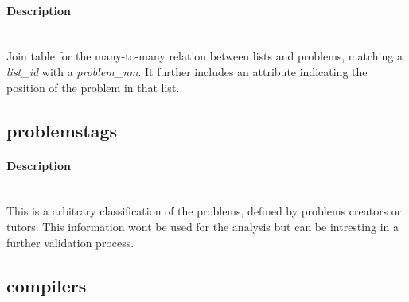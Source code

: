 \paragraph{Description}~\\ %
Join table for the many-to-many relation between lists and problems, matching a \emph{list\_id} with a \emph{problem\_nm}. It further includes an attribute indicating the position of the problem in that list. 



\subsection{problemstags} %
\label{sub:problemstags}

\begin{figure}
  \vspace{-20pt}
  \begin{center}
  \end{center}
  \vspace{-20pt}
\end{figure}

\paragraph{Description}~\\ %
This is a arbitrary classification of the problems, defined by problems creators or tutors. This information wont be used for the analysis but can be intresting in a further validation process.


\subsection{compilers} %
\label{sub:compilers}

